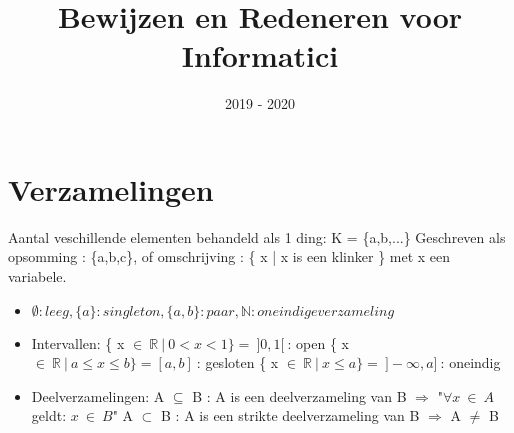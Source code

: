 \documentclass{article}
\title{Bewijzen en Redeneren voor Informatici}
\date{2019 - 2020}
\begin{document}
\maketitle

\section{Verzamelingen}

Aantal veschillende elementen behandeld als 1 ding: K = \{a,b,...\}
Geschreven als opsomming : \{a,b,c\}, of omschrijving : \{ x \big| x is een klinker \} met x een variabele.

\begin{itemize}
\item $\emptyset : leeg , \{a\} : singleton , \{a,b\} : paar, \mathbb{N} : oneindige verzameling$
\item Intervallen: \newline
    \{ x $\in \: \mathbb{R} \: \big| \: 0 < x < 1 \} = \: ]0,1[ \: $: open \newline
    \{ x $\in \: \mathbb{R} \: \big| \: a \leq x \leq b \} = [a,b] \: $: gesloten \newline
    \{ x $\in \: \mathbb{R} \: \big| \: x \leq a \} = \: ]-\infty,a] \: $: oneindig
\item Deelverzamelingen: \newline
    A $\subseteq$ B : A is een deelverzameling van B $\Rightarrow$ "$\forall x \: \in \: A$ geldt: $x \: \in \: B$" \newline
    A $\subset$ B : A is een strikte deelverzameling van B $\Rightarrow$ A $\neq$ B
\end{itemize}
\end{document}
